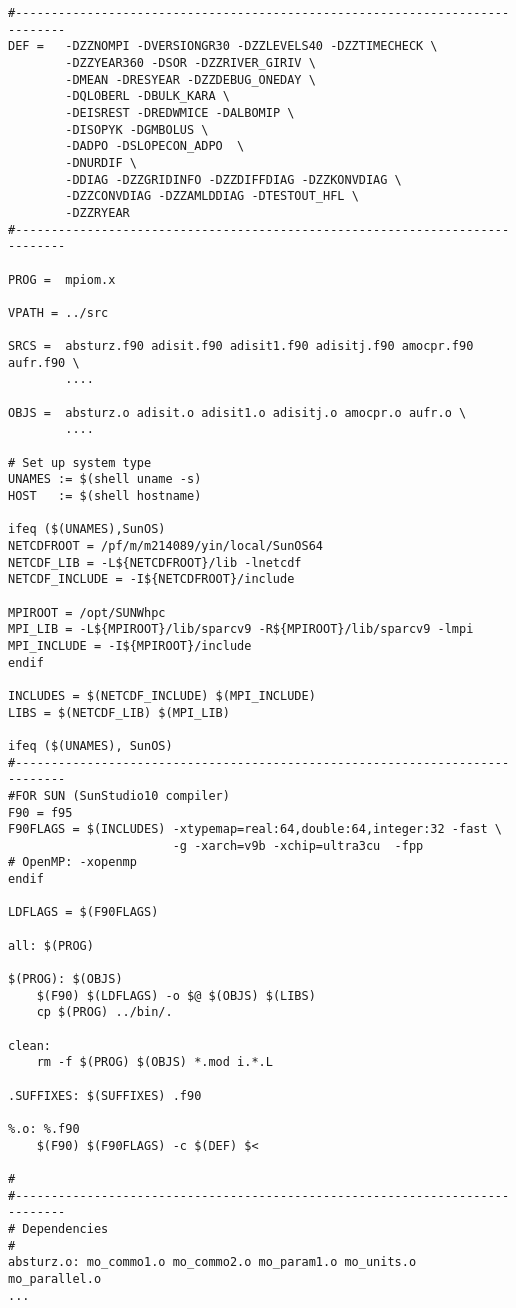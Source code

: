 \begin{footnotesize}
\begin{verbatim}
#-----------------------------------------------------------------------------
DEF =   -DZZNOMPI -DVERSIONGR30 -DZZLEVELS40 -DZZTIMECHECK \
        -DZZYEAR360 -DSOR -DZZRIVER_GIRIV \
        -DMEAN -DRESYEAR -DZZDEBUG_ONEDAY \
        -DQLOBERL -DBULK_KARA \
        -DEISREST -DREDWMICE -DALBOMIP \
        -DISOPYK -DGMBOLUS \
        -DADPO -DSLOPECON_ADPO  \
        -DNURDIF \
        -DDIAG -DZZGRIDINFO -DZZDIFFDIAG -DZZKONVDIAG \
        -DZZCONVDIAG -DZZAMLDDIAG -DTESTOUT_HFL \
        -DZZRYEAR
#-----------------------------------------------------------------------------

PROG =	mpiom.x

VPATH = ../src

SRCS =	absturz.f90 adisit.f90 adisit1.f90 adisitj.f90 amocpr.f90 aufr.f90 \
        ....

OBJS =	absturz.o adisit.o adisit1.o adisitj.o amocpr.o aufr.o \
        ....

# Set up system type
UNAMES := $(shell uname -s)
HOST   := $(shell hostname)

ifeq ($(UNAMES),SunOS)
NETCDFROOT = /pf/m/m214089/yin/local/SunOS64
NETCDF_LIB = -L${NETCDFROOT}/lib -lnetcdf
NETCDF_INCLUDE = -I${NETCDFROOT}/include

MPIROOT = /opt/SUNWhpc
MPI_LIB = -L${MPIROOT}/lib/sparcv9 -R${MPIROOT}/lib/sparcv9 -lmpi
MPI_INCLUDE = -I${MPIROOT}/include
endif

INCLUDES = $(NETCDF_INCLUDE) $(MPI_INCLUDE)
LIBS = $(NETCDF_LIB) $(MPI_LIB)

ifeq ($(UNAMES), SunOS)
#-----------------------------------------------------------------------------
#FOR SUN (SunStudio10 compiler)
F90 = f95
F90FLAGS = $(INCLUDES) -xtypemap=real:64,double:64,integer:32 -fast \
                       -g -xarch=v9b -xchip=ultra3cu  -fpp 
# OpenMP: -xopenmp
endif

LDFLAGS = $(F90FLAGS)

all: $(PROG)

$(PROG): $(OBJS)
	$(F90) $(LDFLAGS) -o $@ $(OBJS) $(LIBS)
	cp $(PROG) ../bin/.

clean:
	rm -f $(PROG) $(OBJS) *.mod i.*.L

.SUFFIXES: $(SUFFIXES) .f90

%.o: %.f90
	$(F90) $(F90FLAGS) -c $(DEF) $<	

#
#-----------------------------------------------------------------------------
# Dependencies
#
absturz.o: mo_commo1.o mo_commo2.o mo_param1.o mo_units.o mo_parallel.o
...
\end{verbatim}
\end{footnotesize}


